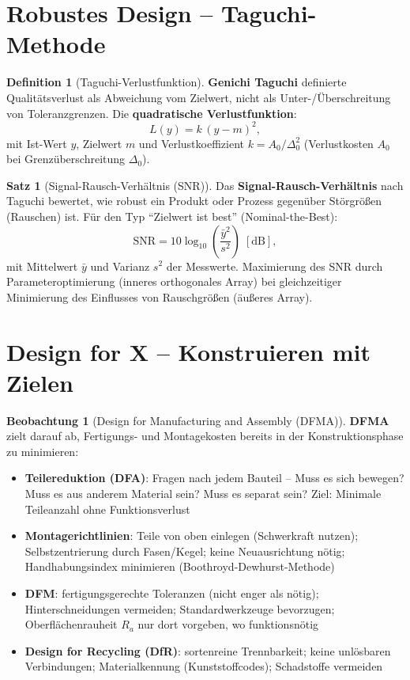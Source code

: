 ﻿\documentclass[a4paper,12pt]{report}
\theoremstyle{definition}
\newtheorem{definition}{Definition}
\newtheorem{satz}{Satz}
\newtheorem{beobachtung}{Beobachtung}
\begin{document}
\section{Robustes Design -- Taguchi-Methode}

\begin{definition}[Taguchi-Verlustfunktion]
\textbf{Genichi Taguchi} definierte Qualitätsverlust als Abweichung vom Zielwert,
nicht als Unter-/Überschreitung von Toleranzgrenzen.
Die \textbf{quadratische Verlustfunktion}:
\[
  L(y) = k\,(y - m)^2,
\]
mit Ist-Wert $y$, Zielwert $m$ und Verlustkoeffizient $k = A_0/\Delta_0^2$
(Verlustkosten $A_0$ bei Grenzüberschreitung $\Delta_0$).
\end{definition}

\begin{satz}[Signal-Rausch-Verhältnis (SNR)]
Das \textbf{Signal-Rausch-Verhältnis} nach Taguchi bewertet, wie robust
ein Produkt oder Prozess gegenüber Störgrößen (Rauschen) ist.
Für den Typ ``Zielwert ist best'' (Nominal-the-Best):
\[
  \mathrm{SNR} = 10\log_{10}\left(\frac{\bar{y}^2}{s^2}\right)\;[\mathrm{dB}],
\]
mit Mittelwert $\bar{y}$ und Varianz $s^2$ der Messwerte.
Maximierung des SNR durch Parameteroptimierung (inneres orthogonales Array)
bei gleichzeitiger Minimierung des Einflusses von Rauschgrößen (äußeres Array).
\end{satz}

\section{Design for X -- Konstruieren mit Zielen}

\begin{beobachtung}[Design for Manufacturing and Assembly (DFMA)]
\textbf{DFMA} zielt darauf ab, Fertigungs- und Montagekosten bereits
in der Konstruktionsphase zu minimieren:
\begin{itemize}
    \item[-] \textbf{Teilereduktion (DFA)}: Fragen nach jedem Bauteil --
          Muss es sich bewegen? Muss es aus anderem Material sein? Muss es separat sein?
          Ziel: Minimale Teileanzahl ohne Funktionsverlust
    \item[-] \textbf{Montagerichtlinien}: Teile von oben einlegen (Schwerkraft nutzen);
          Selbstzentrierung durch Fasen/Kegel; keine Neuausrichtung nötig;
          Handhabungsindex minimieren (Boothroyd-Dewhurst-Methode)
    \item[-] \textbf{DFM}: fertigungsgerechte Toleranzen (nicht enger als nötig);
          Hinterschneidungen vermeiden; Standardwerkzeuge bevorzugen;
          Oberflächenrauheit $R_a$ nur dort vorgeben, wo funktionsnötig
    \item[-] \textbf{Design for Recycling (DfR)}: sortenreine Trennbarkeit;
          keine unlösbaren Verbindungen; Materialkennung (Kunststoffcodes);
          Schadstoffe vermeiden
\end{itemize}
\end{beobachtung}
\end{document}
